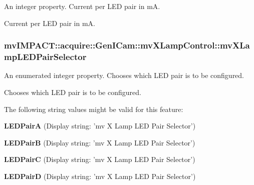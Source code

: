 An integer property. Current per L\+E\+D pair in m\+A. 

Current per L\+E\+D pair in m\+A. \hypertarget{classmv_i_m_p_a_c_t_1_1acquire_1_1_gen_i_cam_1_1mv_x_lamp_control_a0fd6dbe59fe73c3a0006f2f814488ad8}{
\subsubsection[{mv\+X\+Lamp\+L\+E\+D\+Pair\+Selector}]{ mv\+I\+M\+P\+A\+C\+T\+::acquire\+::\+Gen\+I\+Cam\+::mv\+X\+Lamp\+Control\+::mv\+X\+Lamp\+L\+E\+D\+Pair\+Selector}}\label{classmv_i_m_p_a_c_t_1_1acquire_1_1_gen_i_cam_1_1mv_x_lamp_control_a0fd6dbe59fe73c3a0006f2f814488ad8}


An enumerated integer property. Chooses which L\+E\+D pair is to be configured. 

Chooses which L\+E\+D pair is to be configured.

The following string values might be valid for this feature\+:
\begin{DoxyItemize}
\item {\bfseries L\+E\+D\+Pair\+A} (Display string\+: 'mv X Lamp L\+E\+D Pair Selector')
\item {\bfseries L\+E\+D\+Pair\+B} (Display string\+: 'mv X Lamp L\+E\+D Pair Selector')
\item {\bfseries L\+E\+D\+Pair\+C} (Display string\+: 'mv X Lamp L\+E\+D Pair Selector')
\item {\bfseries L\+E\+D\+Pair\+D} (Display string\+: 'mv X Lamp L\+E\+D Pair Selector')
\end{DoxyItemize}


